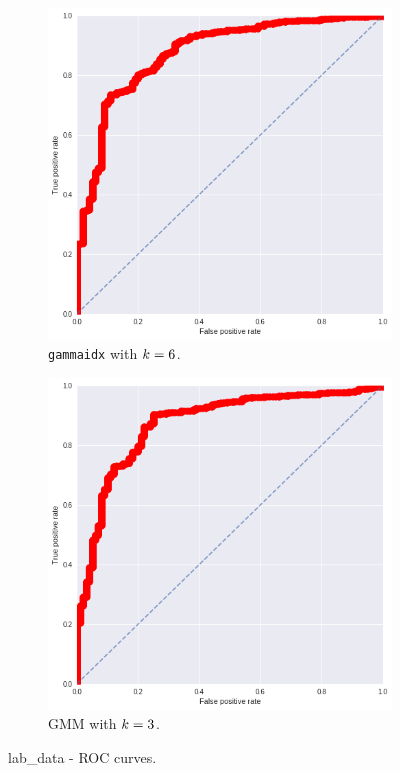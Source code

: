 \documentclass[a4paper,11pt]{article}
\begin{document}
\begin{figure}
    \centering
    \begin{subfigure}[b]{0.45\textwidth}
        \includegraphics[scale=0.3]{../images/assignment10_3.png}
        \caption{\small{\texttt{gammaidx} with $\protect k=6$.}}
        \label{fig:assignment10_1_1}
    \end{subfigure}
    \hfill
    \begin{subfigure}[b]{0.45\textwidth}
        \includegraphics[scale=0.3]{../images/assignment10_4.png}
        \caption{\small{GMM with $\protect k=3$.}}
        \label{fig:assignment10_1_2}
    \end{subfigure}
    \caption{\small{lab\_data - ROC curves.}}
    \label{fig:assignment10_1}
\end{figure}
\end{document}
